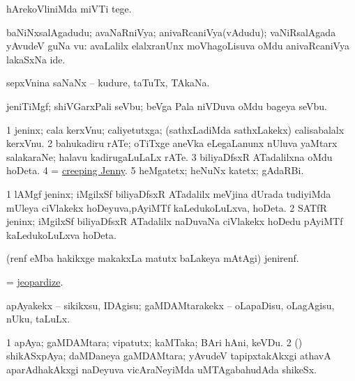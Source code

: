 \bentry
{}
\gl{\sakirx}
\bmng
hArekoVliniMda miVTi tege. 
\emng
\eentry

\bentry
{}
\gl{\nA}
\expl{\F}
\bmng
baNiNxsalAgadudu; avaNaRniVya; anivaRcaniVya(vAdudu); vaNiRsalAgada yAvudeV guNa \mo vu:    avaLalilx elalxranUnx moVhagoLisuva oMdu anivaRcaniVya lakaSxNa ide. 
\emng
\eentry

\bentry
{}
\gl{\nA}
\bmng
sepxVnina saNaNx -- kudure, taTuTx, TAkaNa. 
\emng
\eentry

\bentry
{}
\gl{\nA}
\bmng
jeniTiMgf; shiVGarxPali seVbu; beVga Pala niVDuva oMdu bageya seVbu. 
\emng
\eentry

\bentry
{}
\gl{\nA}
\bmng
\bnum
\num{1} jeninx; cala kerxVnu; caliyetutxga; (sathxLadiMda sathxLakekx) calisabalalx kerxVnu. 
\num{2} bahukadiru rATe; oTiTxge aneVka eLegaLanunx nUluva yaMtarx salakaraNe; halavu kadirugaLuLaLx rATe. 
\num{3} biliyaDfsxR ATadalilxna oMdu hoDeta. 
\num{4} = \hyperref{kandict_c.pdf}{C}{creeping Jenny}{creeping Jenny}. 
\num{5} heMgatetx; heNuNx katetx; gAdaRBi. 
\enum
\emng

\noindent
\gl{\pagu}
\bmng
\bnum
\num{1}  lAMgf jeninx; iMgilxSf biliyaDfsxR ATadalilx meVjina dUrada tudiyiMda mUleya ciVlakekx hoDeyuva,pAyiMTf kaLedukoLuLxva, hoDeta. 
\num{2}  SATfR jeninx; iMgilxSf biliyaDfsxR ATadalilx naDuvaNa ciVlakekx hoDedu pAyiMTf kaLedukoLuLxva hoDeta. 
\enum
\emng
\eentry

\bentry
{}
\gl{\nA}
\bmng
(renf eMba hakikxge makakxLa matutx baLakeya mAtAgi) jenirenf. 
\emng
\eentry

\bentry
{}
\gl{\sakirx}
\bmng
= \hyperlink{jeopardize}{jeopardize}. 
\emng
\eentry

\bentry
{}
\gl{\sakirx}
\bmng
apAyakekx -- sikikxsu, IDAgisu; gaMDAMtarakekx -- oLapaDisu, oLagAgisu, nUku, taLuLx. 
\emng
\eentry

\bentry
{}
\gl{\nA}
\bmng
\bnum
\num{1} apAya; gaMDAMtara; vipatutx; kaMTaka; BAri hAni, keVDu. 
\num{2} (\nAyxshA) shikASxpAya; daMDaneya gaMDAMtara; yAvudeV tapipxtakAkxgi athavA aparAdhakAkxgi naDeyuva vicAraNeyiMda uMTAgabahudAda shikeSx. 
\enum
\emng
\eentry

